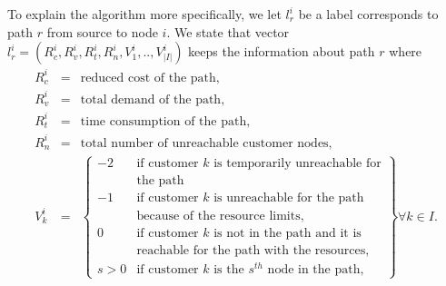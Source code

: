 To explain the algorithm more specifically, we let $l_r^i$ be a label corresponds to 
path $r$ from source to node $i$. We state that vector 
$l_r^i = (R^i_c, R^i_{v},R^i_{t}, R^i_n, V^i_1,..,V^i_{|I|})$ keeps the information
about path $r$ where
\begin{eqnarray*}
  R^i_c    & = & \mbox{reduced cost of the path,} \\
  R^i_{v}  & = & \mbox{total demand of the path,}  \\
  R^i_{t}  & = & \mbox{time consumption of the path,}  \\
  R^i_n    & = & \mbox{total number of unreachable customer nodes,}  \\ 
  V^i_k & = & \left\{ \begin{array}{llll}
                  -2 & \mbox{if customer $k$ is temporarily unreachable for}\\
                     & \mbox{the path}\\
                  -1 & \mbox{if customer $k$ is unreachable for the path}  \\
                     & \mbox{because of the resource limits,} \\
                  0  & \mbox{if customer $k$ is not in the path and it is}  \\
                     & \mbox{reachable for the path with the resources,}  \\
                 s>0 & \mbox{if customer $k$ is the $s^{th}$ node in the path,} 
                \end{array} 
              \right\} \forall k \in I. 
\end{eqnarray*}
